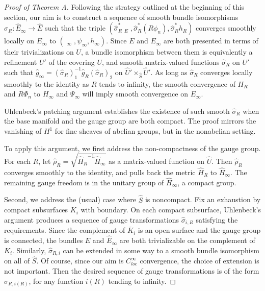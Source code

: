 \documentclass[10pt]{amsart}
\DeclareMathOperator{\dbar}{\overline{\partial}}
\theoremstyle{definition}
\begin{document}
\begin{proof}[Proof of Theorem A]
Following the strategy outlined at the beginning of this section, our aim is to construct a sequence of smooth bundle isomorphisms $\hat{\sigma}_R: \hat{E}_{\infty} \to \hat{E}$ such that the triple $(\hat{\sigma}_R^* \dbar_E, \hat{\sigma}_R^*(R\phi_n), \hat{\sigma}_R^*h_R)$ converges smoothly locally on $E_\infty$ to $(\dbar_\infty, \psi_\infty, h_\infty)$. Since $E$ and $E_\infty$ are both presented in terms of their trivializations on $U$, a bundle isomorphism between them is equivalently a refinement $U'$ of the covering $U$, and smooth matrix-valued functions $\hat{\sigma}_R$ on $U'$ such that $\hat{g}_\infty = (\hat{\sigma}_R)_1^{-1}\hat{g}_R (\hat{\sigma}_R)_2$ on $\hat{U}' \times_{\hat{S}} \hat{U}'$. As long as $\hat{\sigma}_R$ converges locally smoothly to the identity as $R$ tends to infinity, the smooth convergence of $H_R$ and $R\Phi_n$ to $H_\infty$ and $\Psi_\infty$ will imply smooth convergence on $E_\infty$.

Uhlenbeck's patching argument \cite[Proposition 3.2]{Uh1} establishes the existence of such smooth $\hat{\sigma}_R$ when the base manifold and the gauge group are both compact. The proof mirrors the vanishing of $H^1$ for fine sheaves of abelian groups, but in the nonabelian setting.

To apply this argument, we first address the non-compactness of the gauge group. For each $R$, let $\hat{\rho}_R = \sqrt{{\hat{H}_R}^{-1}\hat{H}_\infty}$ as a matrix-valued function on $\hat{U}$. Then $\hat{\rho}_R$ converges smoothly to the identity, and pulls back the metric $\hat{H}_R$ to $\hat{H}_\infty$. The remaining gauge freedom is in the unitary group of $\hat{H}_\infty$, a compact group.

Second, we address the (usual) case where $\hat{S}$ is noncompact. Fix an exhaustion by compact subsurfaces $K_i$ with boundary. On each compact subsurface, Uhlenbeck's argument produces a sequence of gauge transformations $\hat{\sigma}_{i,R}$ satisfying the requirements. Since the complement of $\overline{K}_i$ is an open surface and the gauge group is connected, the bundles $\hat{E}$ and $\hat{E}_\infty$ are both trivializable on the complement of $K_i$. Similarly, $\hat{\sigma}_{R,i}$ can be extended in some way to a smooth bundle isomorphism on all of $\hat{S}$. Of course, since our aim is $C^\infty_{loc}$ convergence, the choice of extension is not important. Then the desired sequence of gauge transformations is of the form $\hat{\sigma}_{R, i(R)}$, for any function $i(R)$ tending to infinity.

\end{proof}
\end{document}
